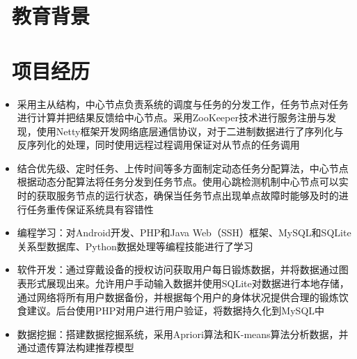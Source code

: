 \documentclass{resume}
\begin{document}


 
\section{\faGraduationCap\ 教育背景}

\section{\faUsers\ 项目经历}

\begin{onehalfspacing}
\begin{itemize}
  \item 采用主从结构，中心节点负责系统的调度与任务的分发工作，任务节点对任务进行计算并把结果反馈给中心节点。采用ZooKeeper技术进行服务注册与发现，使用Netty框架开发网络底层通信协议，对于二进制数据进行了序列化与反序列化的处理，同时使用远程过程调用保证对从节点的任务调用
  \item 结合优先级、定时任务、上传时间等多方面制定动态任务分配算法，中心节点根据动态分配算法将任务分发到任务节点。使用心跳检测机制中心节点可以实时的获取服务节点的运行状态，确保当任务节点出现单点故障时能够及时的进行任务重传保证系统具有容错性
\end{itemize}
\end{onehalfspacing}

\begin{itemize}
  \item 编程学习：对Android开发、PHP和Java Web（SSH）框架、MySQL和SQLite关系型数据库、Python数据处理等编程技能进行了学习
  \item 软件开发：通过穿戴设备的授权访问获取用户每日锻炼数据，并将数据通过图表形式展现出来。允许用户手动输入数据并使用SQLite对数据进行本地存储，通过网络将所有用户数据备份，并根据每个用户的身体状况提供合理的锻炼饮食建议。后台使用PHP对用户进行用户验证，将数据持久化到MySQL中
  \item 数据挖掘：搭建数据挖掘系统，采用Apriori算法和K-means算法分析数据，并通过遗传算法构建推荐模型
\end{itemize}
\end{document}
